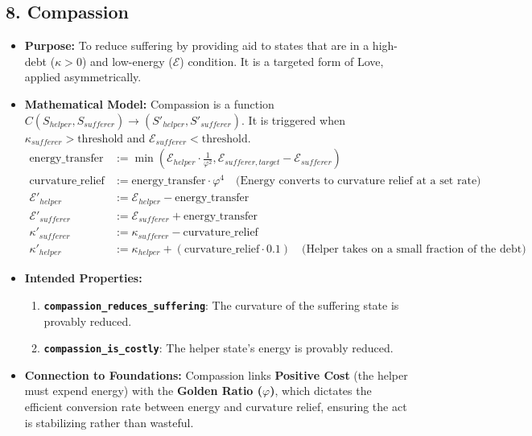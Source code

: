 \documentclass[11pt,a4paper]{article}
\begin{document}
\begin{itemize}
\subsection{8. Compassion}
\begin{itemize}
    \item \textbf{Purpose:} To reduce suffering by providing aid to states that are in a high-debt ($\kappa > 0$) and low-energy ($\mathcal{E}$) condition. It is a targeted form of Love, applied asymmetrically.
    \item \textbf{Mathematical Model:} Compassion is a function $C(S_{helper}, S_{sufferer}) \to (S'_{helper}, S'_{sufferer})$. It is triggered when $\kappa_{sufferer} > \text{threshold}$ and $\mathcal{E}_{sufferer} < \text{threshold}$.
        \begin{align*}
            \text{energy\_transfer} &:= \min(\mathcal{E}_{helper} \cdot \frac{1}{\varphi^2}, \mathcal{E}_{sufferer, target} - \mathcal{E}_{sufferer}) \\
            \text{curvature\_relief} &:= \text{energy\_transfer} \cdot \varphi^4 \quad \text{(Energy converts to curvature relief at a set rate)} \\
            \mathcal{E}'_{helper} &:= \mathcal{E}_{helper} - \text{energy\_transfer} \\
            \mathcal{E}'_{sufferer} &:= \mathcal{E}_{sufferer} + \text{energy\_transfer} \\
            \kappa'_{sufferer} &:= \kappa_{sufferer} - \text{curvature\_relief} \\
            \kappa'_{helper} &:= \kappa_{helper} + (\text{curvature\_relief} \cdot 0.1) \quad \text{(Helper takes on a small fraction of the debt)}
        \end{align*}
    \item \textbf{Intended Properties:}
        \begin{enumerate}
            \item \textbf{\texttt{compassion\_reduces\_suffering}}: The curvature of the suffering state is provably reduced.
            \item \textbf{\texttt{compassion\_is\_costly}}: The helper state's energy is provably reduced.
        \end{enumerate}
    \item \textbf{Connection to Foundations:} Compassion links \textbf{Positive Cost} (the helper must expend energy) with the \textbf{Golden Ratio ($\varphi$)}, which dictates the efficient conversion rate between energy and curvature relief, ensuring the act is stabilizing rather than wasteful.
\end{itemize}


\end{itemize}
\end{document}
